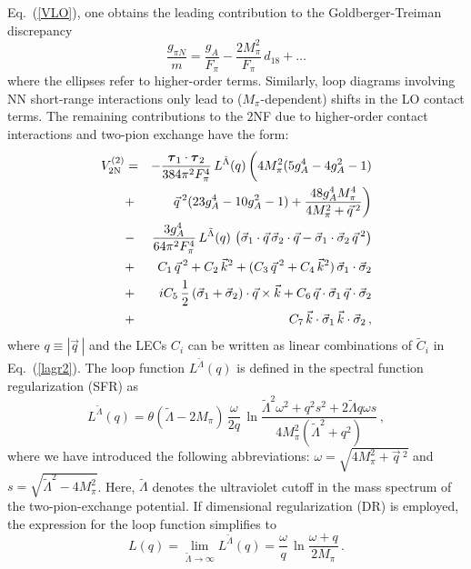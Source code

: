\documentclass[aps,rmp,nofootinbib,twocolumn,floatfix]{revtex4}
\newcommand{\beq}{\begin{equation}}
\newcommand{\eeq}{\end{equation}}
\newcommand{\beqa}{\begin{eqnarray}}
\newcommand{\eeqa}{\end{eqnarray}}
\newcommand{\fet}[1]{\mbox{\boldmath $#1$}}
\newcommand{\nn}{\nonumber \\ }
\begin{document}
Eq.~(\ref{VLO}), one obtains the leading contribution to the Goldberger-Treiman 
discrepancy \cite{Epelbaum:2002gb}
\beq
\label{GTD}
\frac{g_{\pi N}}{m} = \frac{g_A}{F_\pi} 
 - \frac{ 2 M_\pi^2}{F_\pi} \, d_{18} + \ldots
\eeq
where the ellipses refer to higher-order terms. Similarly, loop diagrams
involving NN short-range interactions only lead to ($M_\pi$-dependent) shifts
in the LO contact terms. The remaining contributions to the 2NF due to 
higher-order contact interactions and two-pion exchange have the form: 
\beqa
\label{VNLO}
V^{(2)}_{\rm 2N} &=&  - \frac{ \fet{\tau}_1 \cdot \fet{\tau}_2 }{384 \pi^2 F_\pi^4}\,
L^{\tilde \Lambda} (q) \, \bigg( 4M_\pi^2 (5g_A^4 - 4g_A^2 -1)\nonumber\\
&+& \vec{q}\, ^2 (23g_A^4 - 10g_A^2 -1)
+ \frac{48 g_A^4 M_\pi^4}{4 M_\pi^2 + \vec{q} \, ^2} \bigg) \nn
&-&  \frac{3 g_A^4}{64 \pi^2 F_\pi^4} \,L^{\tilde \Lambda} (q)  \, 
\left(  \vec \sigma_1 \cdot \vec q  \, \vec \sigma_2 \cdot \vec q   -  \vec \sigma_1 \cdot\vec
\sigma_2  \, \vec{q} \, ^2 \right) \nn 
&+& C_1 \, \vec{q}\,^2 + C_2 \, \vec{k}^2 +
( C_3 \, \vec{q}\,^2 + C_4 \, \vec{k}^2 ) \,  \vec{\sigma}_1 \cdot
\vec{\sigma}_2 \nn
&+& iC_5\, \frac{1}{2} \, ( \vec{\sigma}_1 + \vec{\sigma}_2) \cdot  \vec{q} \times
\vec{k}
 + C_6 \, \vec{q}\cdot \vec{\sigma}_1 \, \vec{q}\cdot \vec{\sigma}_2  
\nn
&+& C_7 \, \vec{k}\cdot \vec{\sigma}_1 \, \vec{k}\cdot \vec{\sigma}_2 \,,
\eeqa
where $q \equiv | \vec q \, |$ and the LECs $C_i$ can be written as linear
combinations of $\tilde C_i$ in Eq.~(\ref{lagr2}). The loop function
$L^{\tilde \Lambda} (q)$ is defined in the spectral function regularization (SFR)
\cite{Epelbaum:2003gr,Epelbaum:2003xx} as
\beq
\label{def_LA}
L^{\tilde \Lambda} (q) = \theta (\tilde \Lambda - 2 M_\pi ) \, \frac{\omega}{2 q} \, 
\ln \frac{\tilde \Lambda^2 \omega^2 + q^2 s^2 + 2 \tilde \Lambda q 
\omega s}{4 M_\pi^2 ( \tilde \Lambda^2 + q^2)} \,,
\eeq
where we have introduced the following abbreviations: 
$\omega = \sqrt{4 M_\pi^2 + \vec{q}\, ^2}$ and 
$s = \sqrt{\tilde \Lambda^2 - 4 M_\pi^2}$. Here, $\tilde \Lambda$ denotes the
ultraviolet cutoff in the mass spectrum of the two-pion-exchange potential. If dimensional regularization
(DR) is employed, the expression for the loop function simplifies to 
\beq
L (q) = \lim_{\tilde \Lambda \to \infty} L^{\tilde \Lambda} (q) = 
\frac{\omega}{q} \, \ln \frac{\omega + q}{2 M_\pi}\,.
\eeq
\end{document}
